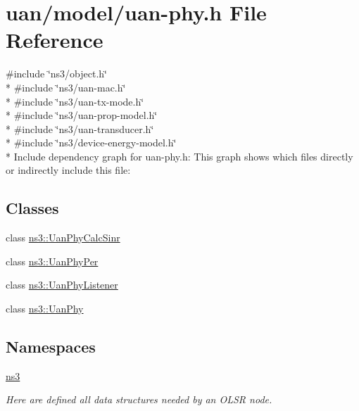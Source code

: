\hypertarget{uan-phy_8h}{}\section{uan/model/uan-\/phy.h File Reference}
\label{uan-phy_8h}
{\ttfamily \#include \char`\"{}ns3/object.\+h\char`\"{}}\\*
{\ttfamily \#include \char`\"{}ns3/uan-\/mac.\+h\char`\"{}}\\*
{\ttfamily \#include \char`\"{}ns3/uan-\/tx-\/mode.\+h\char`\"{}}\\*
{\ttfamily \#include \char`\"{}ns3/uan-\/prop-\/model.\+h\char`\"{}}\\*
{\ttfamily \#include \char`\"{}ns3/uan-\/transducer.\+h\char`\"{}}\\*
{\ttfamily \#include \char`\"{}ns3/device-\/energy-\/model.\+h\char`\"{}}\\*
Include dependency graph for uan-\/phy.h\+:
This graph shows which files directly or indirectly include this file\+:
\subsection*{Classes}
\begin{DoxyCompactItemize}
\item 
class \hyperlink{classns3_1_1UanPhyCalcSinr}{ns3\+::\+Uan\+Phy\+Calc\+Sinr}
\item 
class \hyperlink{classns3_1_1UanPhyPer}{ns3\+::\+Uan\+Phy\+Per}
\item 
class \hyperlink{classns3_1_1UanPhyListener}{ns3\+::\+Uan\+Phy\+Listener}
\item 
class \hyperlink{classns3_1_1UanPhy}{ns3\+::\+Uan\+Phy}
\end{DoxyCompactItemize}
\subsection*{Namespaces}
\begin{DoxyCompactItemize}
\item 
 \hyperlink{namespacens3}{ns3}
\begin{DoxyCompactList}\small\item\em Here are defined all data structures needed by an O\+L\+SR node. \end{DoxyCompactList}\end{DoxyCompactItemize}

